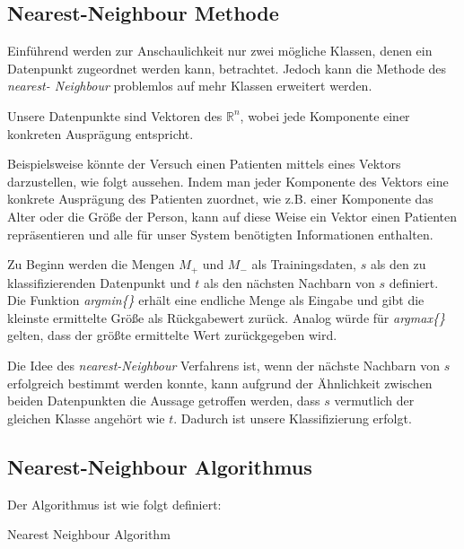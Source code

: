 \documentclass[fontsize=11pt]{scrartcl}
\begin{document}
            \subsection{Nearest-Neighbour Methode}
            \label{subsec:nn-methode}
                Einführend werden zur Anschaulichkeit nur zwei mögliche Klassen, denen ein Datenpunkt zugeordnet werden kann, betrachtet. Jedoch kann die Methode des \emph{nearest- Neighbour} problemlos auf mehr Klassen erweitert werden.\par
                Unsere Datenpunkte sind Vektoren des $\mathbb{R}^n$, wobei jede Komponente einer konkreten Ausprägung entspricht.\par
                Beispielsweise könnte der Versuch einen Patienten mittels eines Vektors darzustellen, wie folgt aussehen. Indem man jeder Komponente des Vektors eine konkrete Ausprägung des Patienten zuordnet, wie z.B. einer Komponente das Alter oder die Größe der Person, kann auf diese Weise ein Vektor einen Patienten repräsentieren und alle für unser System benötigten Informationen enthalten.\par
                Zu Beginn werden die Mengen $M_+$ und $M_-$ als Trainingsdaten, $s$ als den zu klassifizierenden Datenpunkt und $t$ als den nächsten Nachbarn von $s$ definiert. Die Funktion \emph{argmin\{\}} erhält eine endliche Menge als Eingabe und gibt die kleinste ermittelte Größe als Rückgabewert zurück. Analog würde für \emph{argmax\{\}} gelten, dass der größte ermittelte Wert zurückgegeben wird.\par
                        
                Die Idee des \emph{nearest-Neighbour} Verfahrens ist, wenn der nächste Nachbarn von $s$ erfolgreich bestimmt werden konnte, kann aufgrund der Ähnlichkeit zwischen beiden Datenpunkten die Aussage getroffen werden, dass $s$ vermutlich der gleichen Klasse angehört wie $t$. Dadurch ist unsere Klassifizierung erfolgt.
               
                        
            \subsection{Nearest-Neighbour Algorithmus}
            \label{subsec:nnalgo}
             Der Algorithmus ist wie folgt definiert:\par
                            \begin{algorithm}[H]
                                    {
                                        \KwRet{-}\;
                                    }
                                \caption{Nearest Neighbour Algorithm}
                            \end{algorithm}
				
\end{document}
